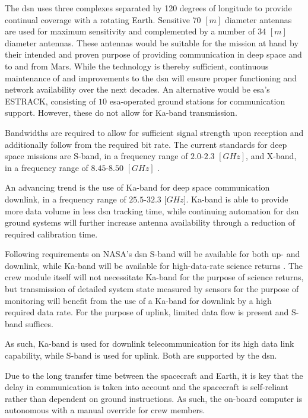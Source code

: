 The \gls{dsn} uses three complexes separated by 120 degrees of longitude to provide continual coverage with a rotating Earth. Sensitive 70 $[m]$ diameter antennas are used for maximum sensitivity and complemented by a number of 34 $[m]$ diameter antennas\cite{Wertz2011}. These antennas would be suitable for the mission at hand by their intended and proven purpose of providing communication in deep space and to and from Mars. While the technology is thereby sufficient, continuous maintenance of and improvements to the \gls{dsn} will ensure proper functioning and network availability over the next decades. An alternative would be \gls{esa}'s ESTRACK, consisting of $10$ \gls{esa}-operated ground stations for communication support. However, these do not allow for Ka-band transmission\cite[p.631]{Wertz2011}.

Bandwidths are required to allow for sufficient signal strength upon reception and additionally follow from the required bit rate. The current standards for deep space missions are S-band, in a frequency range of $2.0$-$2.3$ $[GHz]$, and X-band, in a frequency range of $8.45$-$8.50$ $[GHz]$ \cite{Wertz2011}.

An advancing trend is the use of Ka-band for deep space communication downlink, in a frequency range of $25.5$-$32.3$ [$GHz$]. Ka-band is able to provide more data volume in less \gls{dsn} tracking time, while continuing automation for \gls{dsn} ground systems will further increase antenna availability through a reduction of required calibration time\cite{Edwards1999}. 

Following requirements on NASA's \gls{dsn} S-band will be available for both up- and downlink, while Ka-band will be available for high-data-rate science returns \cite{Labelle2012}. The crew module itself will not necessitate Ka-band for the purpose of science returns, but transmission of detailed system state measured by sensors for the purpose of monitoring will benefit from the use of a Ka-band for downlink by a high required data rate. For the purpose of uplink, limited data flow is present and S-band suffices.%

As such, Ka-band is used for downlink telecommunication for its high data link capability, while S-band is used for uplink. Both are supported by the \gls{dsn}. 

Due to the long transfer time between the spacecraft and Earth, it is key that the delay in communication is taken into account and the spacecraft is self-reliant rather than dependent on ground instructions. As such, the on-board computer is autonomous with a manual override for crew members.